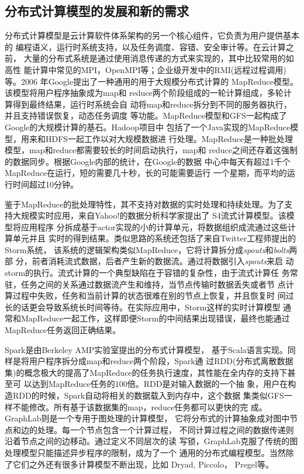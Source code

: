 \subsection{分布式计算模型的发展和新的需求}
分布式计算模型是云计算软件体系架构的另一个核心组件，它负责为用户提供基本的
编程语义，运行时系统支持，以及任务调度、容错、安全审计等。在云计算之前，
大量的分布式系统是通过使用消息传递的方式来实现的，其中比较常用的如高性
能计算中常见的MPI，OpenMPI等；企业级开发中的RMI(远程过程调用)等。2006
年Google提出了一种通用的用于大规模分布式计算的
MapReduce\cite{dean2008mapreduce}模型。该模型将用户程序抽象成为map和
reduce两个阶段组成的一轮计算组成，多轮计算得到最终结果，运行时系统会自
动将map和reduce拆分到不同的服务器执行，并且支持错误恢复，动态任务调度
等功能。MapReduce模型和GFS一起构成了Google的大规模计算的基石。Hadoop项目中
包括了一个Java实现的MapReduce模型，用来和HDFS一起工作以对大规模数据进
行处理。MapReduce是一种批处理模型，map和reduce都需要较长的时间启动执行，map和
reduce之间还存着这强制的数据同步。根据Google内部的统计，在Google的数据
中心中每天有超过1千个MapReduce在运行，短的需要几十秒，长的可能需要运行
一个星期，而平均的运行时间超过10分钟。

鉴于MapReduce的批处理特性，其不支持对数据的实时处理和持续处理。为了支
持大规模实时应用，来自Yahoo!的数据分析科学家提出了
S4\cite{neumeyer2010s4}流式计算模型。该模型将应用程序 
分拆成基于actor实现的小的计算单元，将数据组织成流通过这些计算单元并且
实时的得到结果。类似思路的系统还包括了来自Twitter工程师提出的Storm系统，
该系统的逻辑架构类似MapReduce，它将计算拆分成\textit{spouts}和\textit{bolts}两部
分，前者消耗流式数据，后者产生新的数据流。通过将数据引入\textit{spouts}来启
动storm的执行。流式计算的一个典型缺陷在于容错的复杂性，由于流式计算任
务常驻，任务之间的关系通过数据流产生和维持，当节点传输时数据丢失或者节
点计算过程中失败，任务和当前计算的状态很难在别的节点上恢复，并且恢复时
间过长的话更会导致系统长时间等待。在实际应用中，Storm这样的实时计算模型
通常和MapReduce一起工作，这样即便Storm的中间结果出现错误，最终也能通过
MapReduce任务返回正确结果。

Spark\cite{zaharia2010spark}是由Berkeley AMP实验室提出的分布式计算模型，
基于Scala语言实现。同样是将用户程序拆分成map和reduce两个阶段，Spark通
过RDD(分布式离散数据集)的概念极大的提高了MapReduce的任务执行速度，其性能在全内存的支持下甚至可
以达到MapReduce任务的100倍。RDD是对输入数据的一个抽
象，用户在构造RDD的时候，Spark自动将相关的数据载入到内存中，这个数据
集类似GFS一样不能修改。所有基于该数据集的map，reduce任务都可以更快的完
成。GraphLab\cite{low2012distributed}则是一个专用于图处理的计算模型，
它将分布式的计算抽象成对图中节点和边的处理。每一个节点包含一个计算过程，
不同计算过程之间的数据传递则沿着节点之间的边移动。通过定义不同层次的读
写锁，GraphLab克服了传统的图处理模型只能描述异步程序的限制，成为了一个
通用的分布式编程模型。当然除了它们之外还有很多计算模型不断出现，比如
Dryad\cite{isard2007dryad}, Piccolo\cite{power2010piccolo}，
Pregel\cite{malewicz2010pregel}等。

